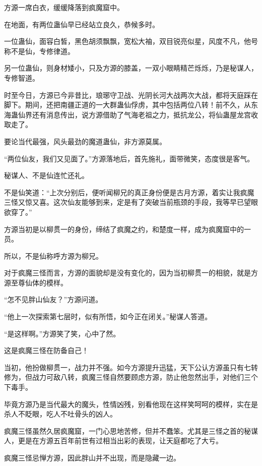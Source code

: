 
\begin{this_body}

方源一席白衣，缓缓降落到疯魔窟中。

在地面，有两位蛊仙早已经站立良久，恭候多时。

一位蛊仙，面容白皙，黑色胡须飘飘，宽松大袖，双目锐亮似星，风度不凡，他号称不是仙，专修律道。

另一位蛊仙，则身材矮小，只及方源的膝盖，一双小眼睛精芒烁烁，乃是秘谋人，专修智道。

时至今日，方源已今非昔比，琅琊守卫战、光阴长河大战两次大战，都将天庭踩在脚下。期间，还把南疆正道的一大群蛊仙俘虏，其中包括两位八转！前不久，从东海蛊仙界还有消息传出，说方源借助了气海老祖之力，抵抗龙公，将仙蛊屋龙宫收取走了。

要论当代最强，风头最劲的魔道蛊仙，非方源莫属。

“两位仙友，我们又见面了。”方源落地后，首先施礼，面带微笑，态度很是客气。

秘谋人、不是仙连忙还礼。

不是仙笑道：“上次分别后，便听闻柳兄的真正身份便是古月方源，着实让我疯魔三怪又惊又喜。这次仙友能够到来，定是有了突破当前瓶颈的手段，我等早已望眼欲穿了。”

方源当初是以柳贯一的身份，缔结了疯魔之约，和楚度一样，成为疯魔窟中的一员。

所以，不是仙称呼方源为柳兄。

对于疯魔三怪而言，方源的面貌却是没有变化的，因为当初柳贯一的相貌，就是方源至尊仙体的模样。

“怎不见胖山仙友？”方源问道。

“他上一次探索第七层时，似有所悟，如今正在闭关。”秘谋人答道。

“是这样啊。”方源笑了笑，心中了然。

这是疯魔三怪在防备自己！

当初，他扮做柳贯一，战力并不强。如今方源提升迅猛，天下公认方源虽只有七转修为，但战力可敌八转，疯魔三怪自然要顾虑方源，防止他忽然出手，对他们三个下毒手。

毕竟方源乃是当代最大的魔头，性情凶残，别看他现在这样笑呵呵的模样，实在是杀人不眨眼，吃人不吐骨头的凶人。

疯魔三怪虽然久居疯魔窟，一门心思地苦修，但并不蠢笨。尤其是三怪之首的秘谋人，更是在方源五百年前世有过相当出彩的表现，让天庭都吃了大亏。

疯魔三怪忌惮方源，因此胖山并不出现，而是隐藏一边。


\end{this_body}
